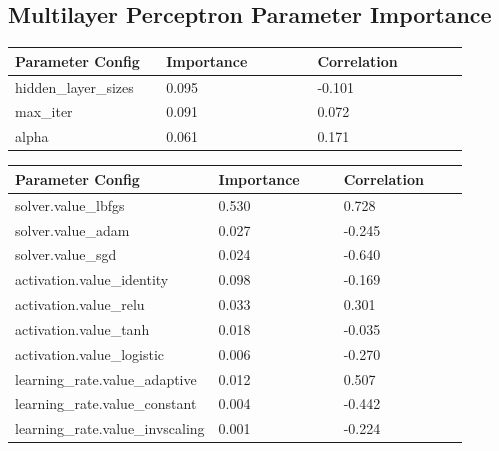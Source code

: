 \documentclass[11pt]{article}
\begin{document}
\begin{appendices}
\subsection{Multilayer Perceptron Parameter Importance}
  \begin{table}[ht]
    \centering
    \begin{tabular}{|p{0.3\linewidth} | p{0.3\linewidth}| p{0.3\linewidth}|} 
      \hline
      \textbf{Parameter Config}  & \textbf{Importance} & \textbf{Correlation} \\ \hline
        hidden\_layer\_sizes & 0.095 & -0.101 \\ \hline
        max\_iter & 0.091 & 0.072 \\ \hline
        alpha & 0.061 & 0.171 \\ \hline
    \end{tabular}
  \end{table}\label{MLP_ParamImp1}

  
  \begin{table}[ht]
    \centering
    \begin{tabular}{|p{0.3\linewidth} | p{0.3\linewidth}| p{0.3\linewidth}|} 
      \hline
      \textbf{Parameter Config}  & \textbf{Importance} & \textbf{Correlation} \\ \hline
        solver.value\_lbfgs & 0.530 & 0.728 \\ \hline
        solver.value\_adam & 0.027 & -0.245 \\ \hline
        solver.value\_sgd & 0.024 & -0.640 \\ \hline
        activation.value\_identity & 0.098 & -0.169 \\ \hline
        activation.value\_relu & 0.033 & 0.301 \\ \hline
        activation.value\_tanh & 0.018 & -0.035 \\ \hline
        activation.value\_logistic & 0.006 & -0.270 \\ \hline
        learning\_rate.value\_adaptive & 0.012 & 0.507 \\ \hline
        learning\_rate.value\_constant & 0.004 & -0.442 \\ \hline
        learning\_rate.value\_invscaling & 0.001 & -0.224 \\ \hline
    \end{tabular}
  \end{table}\label{MLP_ParamImp2}


\end{appendices}
\end{document}
